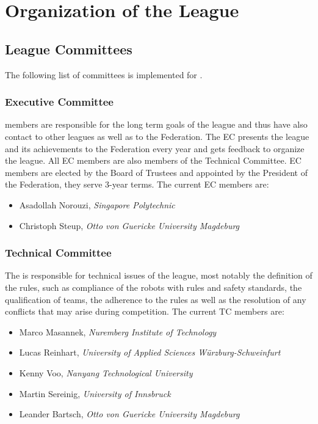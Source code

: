 \section{Organization of the League}\label{sec:organisation_of_the_league}

\subsection{League Committees}
The following list of committees is implemented for \RCAW.

\subsubsection{Executive Committee}

 members are responsible for the long term goals of the league and thus have also contact to other leagues as well as to the \RC Federation. The EC presents the league and its achievements to the \RC Federation every year and gets feedback to organize the league. All EC members are also members of the Technical Committee. EC members are elected by the Board of Trustees and appointed by the President of the \RC Federation, they serve 3-year terms. The current EC members are:

\begin{itemize}
	\item Asadollah Norouzi, \textit{Singapore Polytechnic}
    \item Christoph Steup, \textit{Otto von Guericke University Magdeburg}
\end{itemize}


\subsubsection{Technical Committee}
The  is responsible for technical issues of the league, most notably the definition of the rules, such as compliance of the robots with rules and safety standards, the qualification of teams, the adherence to the rules as well as the resolution of any conflicts that may arise during competition. The current TC members are:

\begin{itemize}
    \item Marco Masannek, \textit{Nuremberg Institute of Technology}
	\item Lucas Reinhart, \textit{University of Applied Sciences Würzburg-Schweinfurt}
    \item Kenny Voo, \textit{Nanyang Technological University} 
    \item Martin Sereinig, \textit{University of Innsbruck} 
    \item Leander Bartsch, \textit{Otto von Guericke University Magdeburg} 
\end{itemize}


